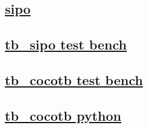 \documentclass{article}
\begin{document}
  


  \subsection{\href{../files/sipo-v.html}{sipo}}
  \subsection{\href{../files2/tb_sipo-v.html}{tb\_sipo test bench}}
  \subsection{\href{../files2/tb_cocotb-v.html}{tb\_cocotb test bench}}
  \subsection{\href{../files2/tb_cocotb-py.html}{tb\_cocotb python}}
\end{document}
